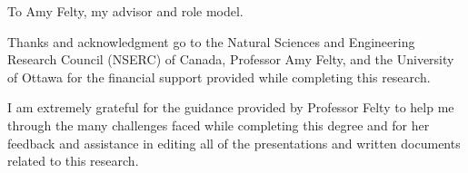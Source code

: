 \documentclass[12pt]{UOthesis}
\theoremstyle{remarkstyle}
\begin{document}

\cleardoublepage


To Amy Felty, my advisor and role model.

\cleardoublepage


Thanks and acknowledgment go to the Natural Sciences and Engineering Research Council (NSERC) of Canada, Professor Amy Felty, and the University of Ottawa for the financial support provided while completing this research.

I am extremely grateful for the guidance provided by Professor Felty to help me through the many challenges faced while completing this degree and for her feedback and assistance in editing all of the presentations and written documents related to this research.
\end{document}
